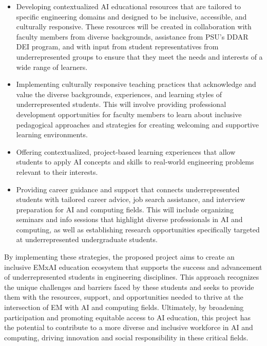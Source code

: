 \documentclass[11pt]{article}
\begin{document}
\begin{itemize}
\item  Developing contextualized AI educational resources that are tailored to specific engineering domains and designed to be inclusive, accessible, and culturally responsive. These resources will be created in collaboration with faculty members from diverse backgrounds, assistance from PSU's DDAR DEI program, and with input from student representatives from underrepresented groups to ensure that they meet the needs and interests of a wide range of learners.

\item  Implementing culturally responsive teaching practices that acknowledge and value the diverse backgrounds, experiences, and learning styles of underrepresented students. This will involve providing professional development opportunities for faculty members to learn about inclusive pedagogical approaches and strategies for creating welcoming and supportive learning environments.


\item  Offering contextualized, project-based learning experiences that allow students to apply AI concepts and skills to real-world engineering problems relevant to their interests. 

\item  Providing career guidance and support that connects underrepresented students with tailored career advice, job search assistance, and interview preparation for AI and computing fields. 
This will include organizing seminars and info sessions that highlight diverse professionals in AI and computing, as well as establishing research opportunities specifically targeted at underrepresented undergraduate students.
\end{itemize}

By implementing these strategies, the proposed project aims to create an inclusive EMxAI education ecosystem that supports the success and advancement of underrepresented students in engineering disciplines. 
This approach recognizes the unique challenges and barriers faced by these students and seeks to provide them with the resources, support, and opportunities needed to thrive at the intersection of EM with AI and computing fields. Ultimately, by broadening participation and promoting equitable access to AI education, this project has the potential to contribute to a more diverse and inclusive workforce in AI and computing, driving innovation and social responsibility in these critical fields.
\end{document}
